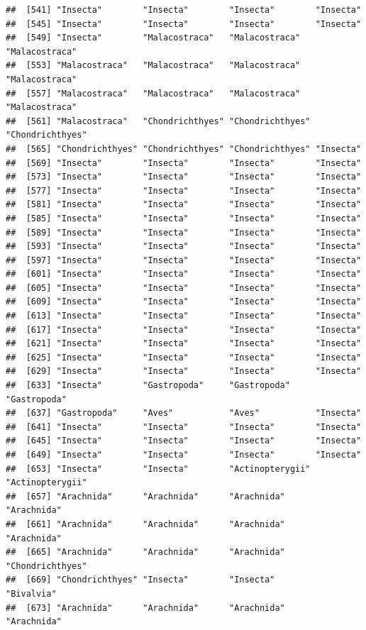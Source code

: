 \documentclass[
]{article}
\begin{document}
\begin{verbatim}
##  [541] "Insecta"        "Insecta"        "Insecta"        "Insecta"       
##  [545] "Insecta"        "Insecta"        "Insecta"        "Insecta"       
##  [549] "Insecta"        "Malacostraca"   "Malacostraca"   "Malacostraca"  
##  [553] "Malacostraca"   "Malacostraca"   "Malacostraca"   "Malacostraca"  
##  [557] "Malacostraca"   "Malacostraca"   "Malacostraca"   "Malacostraca"  
##  [561] "Malacostraca"   "Chondrichthyes" "Chondrichthyes" "Chondrichthyes"
##  [565] "Chondrichthyes" "Chondrichthyes" "Chondrichthyes" "Insecta"       
##  [569] "Insecta"        "Insecta"        "Insecta"        "Insecta"       
##  [573] "Insecta"        "Insecta"        "Insecta"        "Insecta"       
##  [577] "Insecta"        "Insecta"        "Insecta"        "Insecta"       
##  [581] "Insecta"        "Insecta"        "Insecta"        "Insecta"       
##  [585] "Insecta"        "Insecta"        "Insecta"        "Insecta"       
##  [589] "Insecta"        "Insecta"        "Insecta"        "Insecta"       
##  [593] "Insecta"        "Insecta"        "Insecta"        "Insecta"       
##  [597] "Insecta"        "Insecta"        "Insecta"        "Insecta"       
##  [601] "Insecta"        "Insecta"        "Insecta"        "Insecta"       
##  [605] "Insecta"        "Insecta"        "Insecta"        "Insecta"       
##  [609] "Insecta"        "Insecta"        "Insecta"        "Insecta"       
##  [613] "Insecta"        "Insecta"        "Insecta"        "Insecta"       
##  [617] "Insecta"        "Insecta"        "Insecta"        "Insecta"       
##  [621] "Insecta"        "Insecta"        "Insecta"        "Insecta"       
##  [625] "Insecta"        "Insecta"        "Insecta"        "Insecta"       
##  [629] "Insecta"        "Insecta"        "Insecta"        "Insecta"       
##  [633] "Insecta"        "Gastropoda"     "Gastropoda"     "Gastropoda"    
##  [637] "Gastropoda"     "Aves"           "Aves"           "Insecta"       
##  [641] "Insecta"        "Insecta"        "Insecta"        "Insecta"       
##  [645] "Insecta"        "Insecta"        "Insecta"        "Insecta"       
##  [649] "Insecta"        "Insecta"        "Insecta"        "Insecta"       
##  [653] "Insecta"        "Insecta"        "Actinopterygii" "Actinopterygii"
##  [657] "Arachnida"      "Arachnida"      "Arachnida"      "Arachnida"     
##  [661] "Arachnida"      "Arachnida"      "Arachnida"      "Arachnida"     
##  [665] "Arachnida"      "Arachnida"      "Arachnida"      "Chondrichthyes"
##  [669] "Chondrichthyes" "Insecta"        "Insecta"        "Bivalvia"      
##  [673] "Arachnida"      "Arachnida"      "Arachnida"      "Arachnida"     

\end{verbatim}
\end{document}
